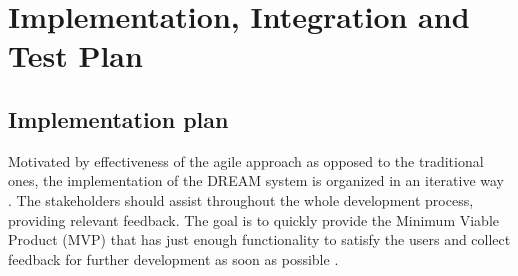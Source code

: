 \chapter{Implementation, Integration and Test Plan}
\section{Implementation plan}
Motivated by effectiveness of the agile approach as opposed to the traditional ones, the implementation of the DREAM system is organized in an iterative way \cite{agile}. The stakeholders should assist throughout the whole development process, providing relevant feedback. The goal is to quickly provide the Minimum Viable Product (MVP) that has just enough functionality to satisfy the users and collect feedback for further development as soon as possible \cite{mvp}.

